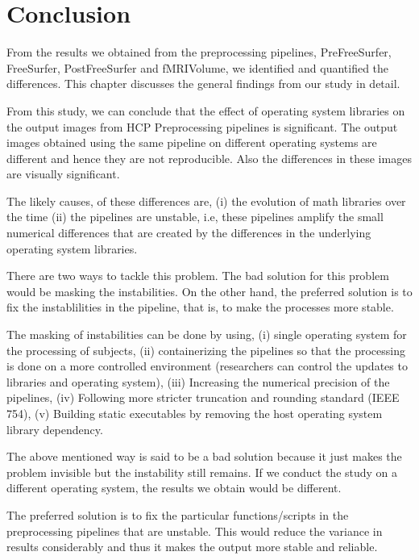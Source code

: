 \chapter{Conclusion}
From the results we obtained from the preprocessing pipelines, PreFreeSurfer, FreeSurfer, PostFreeSurfer and fMRIVolume, we identified and quantified the differences. This chapter discusses the general findings from our study in detail.

From this study, we can conclude that the effect of operating system libraries on the output images from HCP Preprocessing pipelines is significant. The output images obtained using the same pipeline on different operating systems are different and hence they are not reproducible. Also the differences in these images are visually significant.

The likely causes, of these differences are, (i) the evolution of math libraries over the time (ii) the pipelines are unstable, i.e, these pipelines amplify the small numerical differences that are created by the differences in the underlying operating system libraries.

There are two ways to tackle this problem. The bad solution for this problem would be masking the instabilities. On the other hand, the preferred solution is to fix the instablilities in the pipeline, that is, to make the processes more stable.

The masking of instabilities can be done by using, (i) single operating system for the processing of subjects, (ii) containerizing the pipelines so that the processing is done on a more controlled environment (researchers can control the updates to libraries and operating system), (iii) Increasing the numerical precision of the pipelines, (iv) Following more stricter truncation and rounding standard (IEEE 754), (v) Building static executables by removing the host operating system library dependency.

The above mentioned way is said to be a bad solution because it just makes the problem invisible but the instability still remains. If we conduct the study on a different operating system, the results we obtain would be different.

The preferred solution is to fix the particular functions/scripts in the preprocessing pipelines that are unstable. This would reduce the variance in results considerably and thus it makes the output more stable and reliable.



